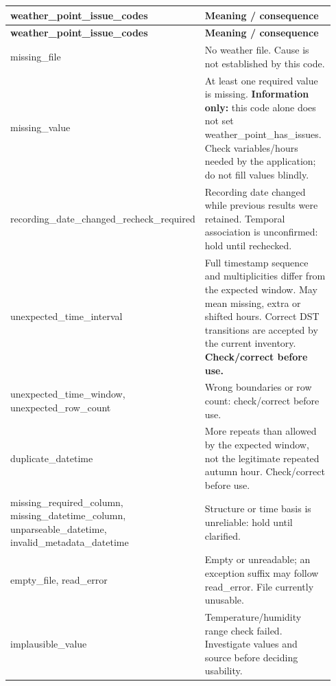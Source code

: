 \documentclass[a4paper,9pt]{extarticle}
\begin{document}
\begingroup\small\begin{longtable}{>{\raggedright\arraybackslash}p{0.39\linewidth}>{\raggedright\arraybackslash}p{0.55\linewidth}}

\rowcolor{navy} \color{white}\bfseries weather\_point\_issue\_codes & \color{white}\bfseries Meaning / consequence \\

\endfirsthead

\rowcolor{navy} \color{white}\bfseries weather\_point\_issue\_codes & \color{white}\bfseries Meaning / consequence \\

\endhead

\rowcolor{pale} missing\_file & No weather file. Cause is not established by this code. \\

missing\_value & At least one required value is missing. \textbf{Information only:} this code alone does not set weather\_point\_has\_issues. Check variables/hours needed by the application; do not fill values blindly. \\

\rowcolor{pale} recording\_date\_changed\_recheck\_required & Recording date changed while previous results were retained. Temporal association is unconfirmed: hold until rechecked. \\

unexpected\_time\_interval & Full timestamp sequence and multiplicities differ from the expected window. May mean missing, extra or shifted hours. Correct DST transitions are accepted by the current inventory. \textbf{Check/correct before use.} \\

\rowcolor{pale} unexpected\_time\_window, unexpected\_row\_count & Wrong boundaries or row count: check/correct before use. \\

duplicate\_datetime & More repeats than allowed by the expected window, not the legitimate repeated autumn hour. Check/correct before use. \\

\rowcolor{pale} missing\_required\_column, missing\_datetime\_column, unparseable\_datetime, invalid\_metadata\_datetime & Structure or time basis is unreliable: hold until clarified. \\

empty\_file, read\_error & Empty or unreadable; an exception suffix may follow read\_error. File currently unusable. \\

\rowcolor{pale} implausible\_value & Temperature/humidity range check failed. Investigate values and source before deciding usability. \\

\end{longtable}\endgroup
\end{document}

